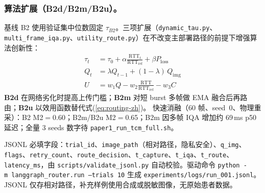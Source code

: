 \subsubsection{算法扩展（B2d/B2m/B2u）。}
基线 B2 使用验证集中位数固定 $\tau_{B2}$。三项扩展（\texttt{dynamic\_tau.py}、\texttt{multi\_frame\_iqa.py}、\texttt{utility\_route.py}）在不改变主部署路径的前提下增强算法创新性：
\begin{align}
\tau_t &= \tau_0 + \alpha \tfrac{\mathrm{RTT}_t}{\mathrm{RTT}_{\mathrm{ref}}} + \beta P_{\mathrm{loss}} \label{eq:dynamic-tau-zh}\\
Q_t &= \lambda Q_{t-1} + (1-\lambda)\, Q_{\mathrm{img}} \label{eq:ema-iqa-zh}\\
U &= w_1 Q - w_2 \tfrac{\mathrm{RTT}}{\mathrm{RTT}_{\mathrm{ref}}} - w_3 C \label{eq:utility-zh}
\end{align}
\textbf{B2d} 在网络劣化时提高上传门槛；\textbf{B2m} 对短 burst 多帧做 EMA 融合后再路由；\textbf{B2u} 以效用函数替代式(\ref{eq:routing-zh})。
快速消融（60 帧、seed~0、物理重采）：B2 M2$=$0.60；B2m/B2u M2$=$0.65；B2m 因多帧 IQA 增加约 69\,ms p50 延迟；全量 3 seeds 数字待 \texttt{paper1\_run\_tcm\_full.sh}。

JSONL 必填字段：\texttt{trial\_id}、\texttt{image\_path}（相对路径，隐私安全）、\texttt{q\_img}、\texttt{flags}、\texttt{retry\_count}、\texttt{route\_decision}、\texttt{t\_capture}、\texttt{t\_iqa}、\texttt{t\_route}、\texttt{latency\_ms}，由 \texttt{scripts/validate\_jsonl.py} 自动校验。驱动命令 \texttt{python\ -m\ langgraph\_router.run\ --trials\ 10} 生成 \texttt{experiments/logs/run\_001.jsonl}。JSONL 仅存相对路径，补充样例使用合成或脱敏图像，无原始患者数据。
